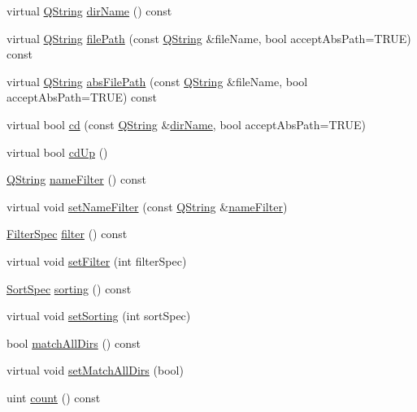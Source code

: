 \begin{DoxyCompactItemize}
\item 
virtual \hyperlink{class_q_string}{Q\-String} \hyperlink{class_q_dir_a66689b909d65b23eb7c218abf3803d84}{dir\-Name} () const 
\item 
virtual \hyperlink{class_q_string}{Q\-String} \hyperlink{class_q_dir_acbf5afb212923b3b8372ca0a6cedb7b5}{file\-Path} (const \hyperlink{class_q_string}{Q\-String} \&file\-Name, bool accept\-Abs\-Path=T\-R\-U\-E) const 
\item 
virtual \hyperlink{class_q_string}{Q\-String} \hyperlink{class_q_dir_ad95e4b854527ddde65755cdea20e6743}{abs\-File\-Path} (const \hyperlink{class_q_string}{Q\-String} \&file\-Name, bool accept\-Abs\-Path=T\-R\-U\-E) const 
\item 
virtual bool \hyperlink{class_q_dir_abfc428d349712e9d797fc713837e3c43}{cd} (const \hyperlink{class_q_string}{Q\-String} \&\hyperlink{class_q_dir_a66689b909d65b23eb7c218abf3803d84}{dir\-Name}, bool accept\-Abs\-Path=T\-R\-U\-E)
\item 
virtual bool \hyperlink{class_q_dir_abb27c61db0ff785666cbd38b73e72af3}{cd\-Up} ()
\item 
\hyperlink{class_q_string}{Q\-String} \hyperlink{class_q_dir_a52e506d0a7174c22b22f5f7c663b7e24}{name\-Filter} () const 
\item 
virtual void \hyperlink{class_q_dir_a7a8c724a5be5ad5af7956b00d220f9b9}{set\-Name\-Filter} (const \hyperlink{class_q_string}{Q\-String} \&\hyperlink{class_q_dir_a52e506d0a7174c22b22f5f7c663b7e24}{name\-Filter})
\item 
\hyperlink{class_q_dir_ae5939bcf9175d1742ed9c51e042efd50}{Filter\-Spec} \hyperlink{class_q_dir_a1087ca52300e3a6e4aa3af11f3e531d4}{filter} () const 
\item 
virtual void \hyperlink{class_q_dir_a45b37db847b9f966f764cd875a3f970c}{set\-Filter} (int filter\-Spec)
\item 
\hyperlink{class_q_dir_ab098a8b38ab309d7073f6920c4811af4}{Sort\-Spec} \hyperlink{class_q_dir_abafa20cd6c524655d4d509d7fbc617df}{sorting} () const 
\item 
virtual void \hyperlink{class_q_dir_a89d3108e4cc3baff1f70b740caf94bfa}{set\-Sorting} (int sort\-Spec)
\item 
bool \hyperlink{class_q_dir_a8adb47f23eab4cb8d65e7f9a66d3895a}{match\-All\-Dirs} () const 
\item 
virtual void \hyperlink{class_q_dir_a4b4ed48f68e5fd116f09dcfb820f56f5}{set\-Match\-All\-Dirs} (bool)
\item 
uint \hyperlink{class_q_dir_a774149fc271ebaba2aabcd183a836e8f}{count} () const 

\end{DoxyCompactItemize}
